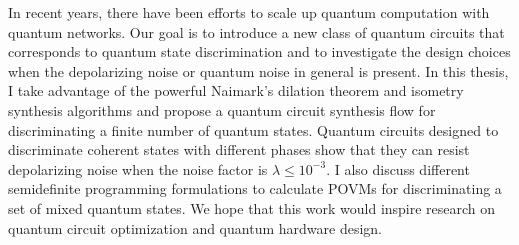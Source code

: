 
\begin{abstract}

近年來，隨著量子計算的發展，擴展量子計算的規模和量子網路已成為研究重點之一。
本論文的目標是提出一類新型的量子電路，專門用於對量子態進行判別，並探討在去極化雜訊或更一般的量子雜訊存在下的設計選擇。

本研究利用強大的奈瑪克擴張定理（Naimark's dilation theorem）與等距映射合成
（isometry synthesis）演算法，建立一套用於有限個量子態判別的量子電路合成流程。
針對不同相位的相干態所設計的量子電路實驗顯示，當去極化雜訊因子 $\lambda \leq 10^{-3}$ 時，
仍具有抗去極化雜訊的能力。

此外，本文亦探討多種正算子值測度（POVM）之半正定規劃（semidefinite programming）公式，用以
判別混合量子態。
期望本研究能為未來的量子電路最佳化與量子硬體設計提供新的啟發與方向。

\end{abstract}

\begin{abstract*}

In recent years, there have been efforts to scale up quantum computation with
quantum networks.
Our goal is to introduce a new class of quantum circuits that corresponds to
quantum state discrimination and to investigate the design choices when the
depolarizing noise or quantum noise in general is present.
In this thesis, I take advantage of the powerful Naimark's dilation theorem
and isometry synthesis algorithms and propose a quantum circuit synthesis
flow for discriminating a finite number of quantum states.
Quantum circuits designed to discriminate coherent states with different
phases show that they can resist depolarizing noise when the noise factor is
$\lambda \leq 10^{-3}$.
I also discuss different semidefinite programming formulations to calculate
POVMs for discriminating a set of mixed quantum states.
We hope that this work would inspire research on quantum circuit optimization
and quantum hardware design.

\end{abstract*}